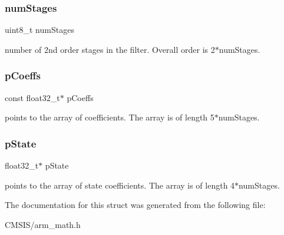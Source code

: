 \subsubsection{\texorpdfstring{numStages}{numStages}}
{\footnotesize\ttfamily uint8\+\_\+t num\+Stages}

number of 2nd order stages in the filter. Overall order is 2$\ast$num\+Stages. \mbox{\label{structarm__biquad__cascade__stereo__df2_t__instance__f32_a39230f04a29d8321948e339633780442}} 
\subsubsection{\texorpdfstring{pCoeffs}{pCoeffs}}
{\footnotesize\ttfamily const float32\+\_\+t$\ast$ p\+Coeffs}

points to the array of coefficients. The array is of length 5$\ast$num\+Stages. \mbox{\label{structarm__biquad__cascade__stereo__df2_t__instance__f32_a335c87e6fdc4b96601d95a5de8b9c463}} 
\subsubsection{\texorpdfstring{pState}{pState}}
{\footnotesize\ttfamily float32\+\_\+t$\ast$ p\+State}

points to the array of state coefficients. The array is of length 4$\ast$num\+Stages. 

The documentation for this struct was generated from the following file\+:\begin{DoxyCompactItemize}
\item 
C\+M\+S\+I\+S/arm\+\_\+math.\+h\end{DoxyCompactItemize}
